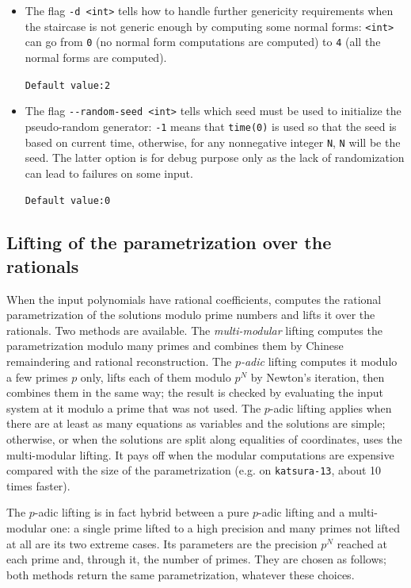 \documentclass[a4paper,english,11pt]{scrartcl}
\theoremstyle{definition}
\theoremstyle{remark}
\begin{document}
\begin{itemize}
  \hfill \verb+Default value:2+

\item The flag \verb+-d <int>+ tells \msolve how to handle further genericity
  requirements when the staircase is not generic enough by computing some normal forms:
  \verb+<int>+ can go from \verb+0+ (no normal form computations are computed) to
  \verb+4+ (all the normal forms are computed).

  \hfill \verb+Default value:2+

\item The flag \verb+--random-seed <int>+ tells \msolve which seed must be used
  to initialize the pseudo-random generator: \verb+-1+ means that
  \verb+time(0)+ is used so that the seed is based on current time,
  otherwise, for any nonnegative integer \verb+N+, \verb+N+ will be the seed. The
  latter option is for debug purpose only as the lack of randomization
  can lead to failures on some input.

  \hfill \verb+Default value:0+

\end{itemize}

\subsection{Lifting of the parametrization over the rationals}\label{sec:lifting}

When the input polynomials have rational coefficients, \msolve computes the
rational parametrization of the solutions modulo prime numbers and lifts it
over the rationals. Two methods are available. The \emph{multi-modular}
lifting computes the parametrization modulo many primes and combines them by
Chinese remaindering and rational reconstruction. The \emph{$p$-adic} lifting
computes it modulo a few primes $p$ only, lifts each of them modulo $p^N$ by
Newton's iteration, then combines them in the same way; the result is
checked by evaluating the input system at it modulo a prime that was not
used. The $p$-adic lifting applies when there are at least as many
equations as variables and the solutions are simple; otherwise, or when the
solutions are split along equalities of coordinates, \msolve uses the
multi-modular lifting. It pays off when the modular computations are
expensive compared with the size of the parametrization (e.g. on
\texttt{katsura-13}, about 10 times faster).

The $p$-adic lifting is in fact hybrid between a pure $p$-adic lifting and
a multi-modular one: a single prime lifted to a high precision and many
primes not lifted at all are its two extreme cases. Its parameters are the
precision $p^N$ reached at each prime and, through it, the number of primes.
They are chosen as follows; both methods return the same parametrization,
whatever these choices.
\end{document}

